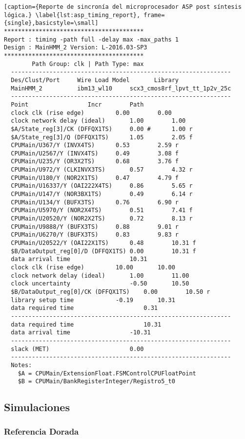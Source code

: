 \newpage

\begin{lstlisting}[caption={Reporte de sincronía del microprocesador ASP post síntesis lógica.} \label{lst:asp_timing_report}, frame={single},basicstyle=\small]
****************************************
Report : timing -path full -delay max -max_paths 1
Design : MainHMM_2 Version: L-2016.03-SP3
****************************************
		Path Group: clk | Path Type: max
  ---------------------------------------------------------------
  Des/Clust/Port     Wire Load Model       Library
  MainHMM_2          ibm13_wl10     scx3_cmos8rf_lpvt_tt_1p2v_25c
  ---------------------------------------------------------------
  Point					Incr		Path
  clock clk (rise edge)			0.00		0.00
  clock network delay (ideal)		1.00		1.00
  $A/State_reg[3]/CK (DFFQX1TS)		0.00 #		1.00 r
  $A/State_reg[3]/Q (DFFQX1TS)		1.05		2.05 f
  CPUMain/U367/Y (INVX4TS)		0.53		2.59 r
  CPUMain/U2567/Y (INVX4TS)		0.49		3.08 f
  CPUMain/U235/Y (OR3X2TS)		0.68		3.76 f
  CPUMain/U972/Y (CLKINVX3TS)		0.57		4.32 r
  CPUMain/U180/Y (NOR2X1TS)		0.47		4.79 f
  CPUMain/U16337/Y (OAI222X4TS)		0.86		5.65 r
  CPUMain/U147/Y (NOR3BX1TS)		0.49		6.14 r
  CPUMain/U134/Y (BUFX3TS)		0.76		6.90 r
  CPUMain/U5970/Y (NOR2X4TS)		0.51		7.41 f
  CPUMain/U20520/Y (NOR2X2TS)		0.72		8.13 r
  CPUMain/U9888/Y (BUFX3TS)		0.88		9.01 r
  CPUMain/U6270/Y (BUFX3TS)		0.83		9.83 r
  CPUMain/U20522/Y (OAI22X1TS)		0.48		10.31 f
  $B/DataOutput_reg[0]/D (DFFQX1TS)	0.00		10.31 f
  data arrival time					10.31
  clock clk (rise edge)			10.00		10.00
  clock network delay (ideal) 		1.00		11.00
  clock uncertainty           		-0.50		10.50
  $B/DataOutput_reg[0]/CK (DFFQX1TS)	0.00		10.50 r
  library setup time			-0.19		10.31
  data required time					0.31
  ---------------------------------------------------------------
  data required time					10.31
  data arrival time					-10.31
  ---------------------------------------------------------------
  slack (MET)						0.00
  ---------------------------------------------------------------
  Notes:
  	$A = CPUMain/ExtensionFloat.FSMControlCPUFloatPoint
  	$B = CPUMain/BankRegisterInteger/Registro5_t0
\end{lstlisting}

\newpage

\subsection{Simulaciones}
\subsubsection{Referencia Dorada}

